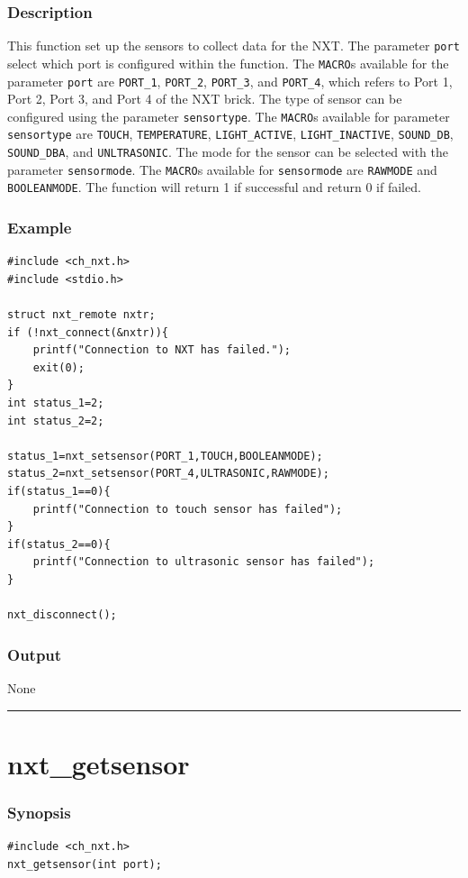 \documentclass[12pt]{article}
\begin{document}
\subsubsection*{Description}
This function set up the sensors to collect data for the NXT. 
The parameter \verb+port+ select which port is configured within the function. 
The \verb+MACRO+s available for the parameter \verb+port+ are \verb+PORT_1+, 	\verb+PORT_2+, \verb+PORT_3+, and \verb+PORT_4+, 	which refers to Port 1, Port 2, Port 3, and Port 4 of the NXT brick. The type of sensor can be configured using the parameter \verb+sensortype+. The \verb+MACRO+s available for parameter \verb+sensortype+ are \verb+TOUCH+, \verb+TEMPERATURE+, 	\verb+LIGHT_ACTIVE+, \verb+LIGHT_INACTIVE+, \verb+SOUND_DB+, \verb+SOUND_DBA+, and \verb+UNLTRASONIC+. The mode for the sensor can be selected with the parameter \verb+sensormode+. The \verb+MACRO+s available for \verb+sensormode+ are \verb+RAWMODE+ and \verb+BOOLEANMODE+. The function will return 1 if successful and return 0 if failed.
\subsubsection*{Example}
\begin{verbatim}
#include <ch_nxt.h> 
#include <stdio.h>

struct nxt_remote nxtr;
if (!nxt_connect(&nxtr)){
    printf("Connection to NXT has failed.");
    exit(0);
}
int status_1=2;
int status_2=2;
    
status_1=nxt_setsensor(PORT_1,TOUCH,BOOLEANMODE);
status_2=nxt_setsensor(PORT_4,ULTRASONIC,RAWMODE);
if(status_1==0){
    printf("Connection to touch sensor has failed");
}
if(status_2==0){
    printf("Connection to ultrasonic sensor has failed");
}
    
nxt_disconnect();
\end{verbatim}

\subsubsection*{Output}
None 
\\

\hrule
\newpage

\section*{nxt\_getsensor}

\subsubsection*{Synopsis}
\begin{verbatim}
#include <ch_nxt.h>
nxt_getsensor(int port);
\end{verbatim}
\end{document}
